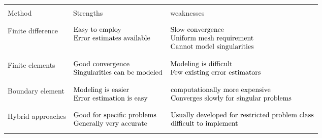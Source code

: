 \documentclass[12pt]{article}
\begin{document}
\begin{center}
    \begin{tabular}{ l l l } 
     \hline
    \\Method             & Strengths &weaknesses\\\\ \hline
    \\Finite difference   & $\begin{array}{@{}l@{}} \text{Easy to employ}\\\text{Error estimates available} \end{array}$& $\begin{array}{@{}l@{}} \text{Slow convergence}\\\text{Uniform mesh requirement} \\\text{Cannot model singularities}\end{array}$ \\\\\hline
    \\Finite elements    & $\begin{array}{@{}l@{}} \text{Good convergence}\\\text{Singularities can be modeled} \end{array}$ &  $\begin{array}{@{}l@{}} \text{Modeling is difficult}\\\text{Few existing error estimators} \end{array}$ \\\\\hline
    \\Boundary element   & $\begin{array}{@{}l@{}} \text{Modeling is easier}\\\text{Error estimation is easy} \end{array}$ &$\begin{array}{@{}l@{}} \text{computationally more expensive }\\\text{Converges slowly for singular problems} \end{array}$\\\\\hline
    \\Hybrid approaches  & $\begin{array}{@{}l@{}} \text{Good for specific problems}\\\text{Generally very accurate} \end{array}$& $\begin{array}{@{}l@{}} \text{Usually developed for restricted problem class}\\\text{difficult to implement} \end{array}$\\ 
     \\\hline
    \end{tabular}
\end{center}
\end{document}
